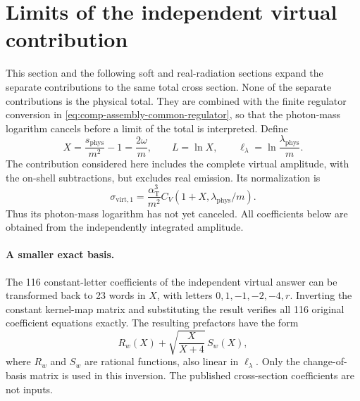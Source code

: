 \section{Limits of the independent virtual contribution}
This section and the following soft and real-radiation sections expand
the separate contributions to the same total cross section. None of
the separate contributions is the physical total. They are combined
with the finite regulator conversion in
\eqref{eq:comp-assembly-common-regulator}, so that the photon-mass
logarithm cancels before a limit of the total is interpreted.
Define
\begin{equation}
 X=\frac{s_{\mathrm{phys}}}{m^2}-1=\frac{2\omega}{m},\qquad
 L=\ln X,\qquad \ell_\lambda=\ln\frac{\lambda_{\mathrm{phys}}}{m}.
\end{equation}
The contribution considered here includes the complete virtual amplitude,
with the on-shell subtractions, but excludes real emission.  Its
normalization is
\begin{equation}
 \sigma_{\mathrm{virt},1}=\frac{\alpha_{\mathrm T}^3}{m^2}C_V(1+X,\lambda_{\mathrm{phys}}/m).
\end{equation}
Thus its photon-mass logarithm has not yet canceled.  All coefficients
below are obtained from the independently integrated amplitude.

\paragraph{A smaller exact basis.}
The 116 constant-letter coefficients of the independent virtual answer
can be transformed back to 23 words in $X$, with letters
$0,1,-1,-2,-4,r$.  Inverting the constant kernel-map matrix and
substituting the result verifies all 116 original coefficient equations
exactly.  The resulting prefactors have the form
\begin{equation}
 R_w(X)+\sqrt{\frac{X}{X+4}}\,S_w(X),
\end{equation}
where $R_w$ and $S_w$ are rational functions, also linear in
$\ell_\lambda$.  Only the change-of-basis matrix is used in this inversion.
The published cross-section coefficients are not inputs.

